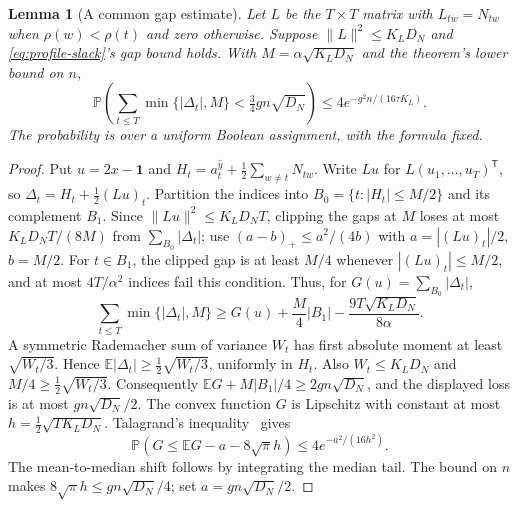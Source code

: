 \documentclass[11pt,a4paper]{article}
\newtheorem{lemma}[theorem]{Lemma}
\theoremstyle{definition}
\theoremstyle{remark}
\newcommand{\E}{\mathbb E}
\newcommand{\Prb}{\mathbb P}
\newcommand{\ind}{\mathbf 1}
\begin{document}
\begin{lemma}[A common gap estimate]\label{lem:counts-profile}
Let $L$ be the $T\times T$ matrix with $L_{tw}=N_{tw}$ when
$\rho(w)<\rho(t)$ and zero otherwise. Suppose $\|L\|^2\le K_LD_N$ and
\eqref{eq:profile-slack}'s gap bound holds. With
$M=\alpha\sqrt{K_LD_N}$ and the theorem's lower bound on $n$,
\[
 \Prb\left(\sum_{t\le T}\min\{|\Delta_t|,M\}
               <\tfrac34gn\sqrt{D_N}\right)
 \le4e^{-g^2n/(16\tau K_L)}.
\]
The probability is over a uniform Boolean assignment, with the formula fixed.
\end{lemma}
\begin{proof}
Put $u=2x-\ind$ and $H_t=a^{\hat y}_t+\frac12\sum_{w\ne t}N_{tw}$.
Write $Lu$ for $L(u_1,\ldots,u_T)^{\mathsf T}$, so
$\Delta_t=H_t+\frac12(Lu)_t$.
Partition the indices into $B_0=\{t:|H_t|\le M/2\}$ and its complement
$B_1$. Since $\|Lu\|^2\le K_LD_NT$, clipping the gaps at $M$ loses at most
$K_LD_NT/(8M)$ from $\sum_{B_0}|\Delta_t|$; use
$(a-b)_+\le a^2/(4b)$ with $a=|(Lu)_t|/2$, $b=M/2$.
For $t\in B_1$, the clipped gap is at least $M/4$ whenever
$|(Lu)_t|\le M/2$, and at most $4T/\alpha^2$ indices fail this condition.
Thus, for $G(u)=\sum_{B_0}|\Delta_t|$,
\[
 \sum_{t\le T}\min\{|\Delta_t|,M\}
 \ge G(u)+\frac M4|B_1|-\frac{9T\sqrt{K_LD_N}}{8\alpha}.
\]
A symmetric Rademacher sum of variance $W_t$ has first absolute moment
at least $\sqrt{W_t/3}$. Hence
$\E|\Delta_t|\ge\frac12\sqrt{W_t/3}$, uniformly in $H_t$.
Also $W_t\le K_LD_N$ and $M/4\ge\frac12\sqrt{W_t/3}$. Consequently
$\E G+M|B_1|/4\ge2gn\sqrt{D_N}$, and the displayed loss is at most
$gn\sqrt{D_N}/2$.
The convex function $G$ is Lipschitz with constant at most
$h=\frac12\sqrt{TK_LD_N}$. Talagrand's inequality~\cite{Tal95} gives
\[
 \Prb(G\le\E G-a-8\sqrt\pi h)\le4e^{-a^2/(16h^2)}.
\]
The mean-to-median shift follows by integrating the median tail.
The bound on $n$ makes $8\sqrt\pi h\le gn\sqrt{D_N}/4$;
set $a=gn\sqrt{D_N}/2$.
\end{proof}
\end{document}
